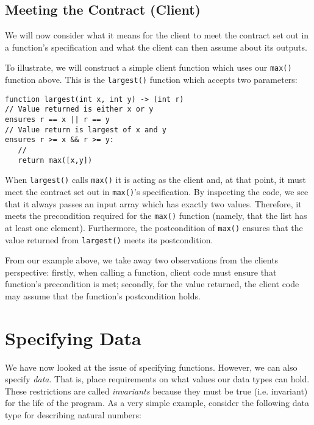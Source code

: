 \subsection{Meeting the Contract (Client)}

We will now consider what it means for the client to meet the contract set out in a function's specification and what the client can then assume about its outputs. 

\begin{eg}
To illustrate, we will construct a simple client function which uses our \lstinline{max()} function above.  This is the \lstinline{largest()} function which accepts two parameters:
\begin{tcolorbox}\begin{lstlisting}[language=Whiley]
function largest(int x, int y) -> (int r)
// Value returned is either x or y
ensures r == x || r == y
// Value return is largest of x and y
ensures r >= x && r >= y:
   //
   return max([x,y])
\end{lstlisting}\end{tcolorbox}
When \lstinline{largest()} calls \lstinline{max()} it is acting as the client and, at that point, it must meet the contract set out in \lstinline{max()}'s specification.  By inspecting the code, we see that it always passes an input array which has exactly two values.  Therefore, it meets the precondition required for the \lstinline{max()} function (namely, that the list has at least one element).  Furthermore, the postcondition of \lstinline{max()} ensures that the value returned from \lstinline{largest()} meets its postcondition.
\end{eg}

From our example above, we take away two observations from the clients perspective:  firstly, when calling a function, client code must ensure that function's precondition is met; secondly, for the value returned, the client code may assume that the function's postcondition holds.

\section{Specifying Data}

We have now looked at the issue of specifying functions.  However, we can also specify {\em data}.  That is, place requirements on what values our data types can hold.  These restrictions are called {\em invariants} because they must be true (i.e. invariant) for the life of the program.  As a very simple example, consider the following data type for describing natural numbers:

